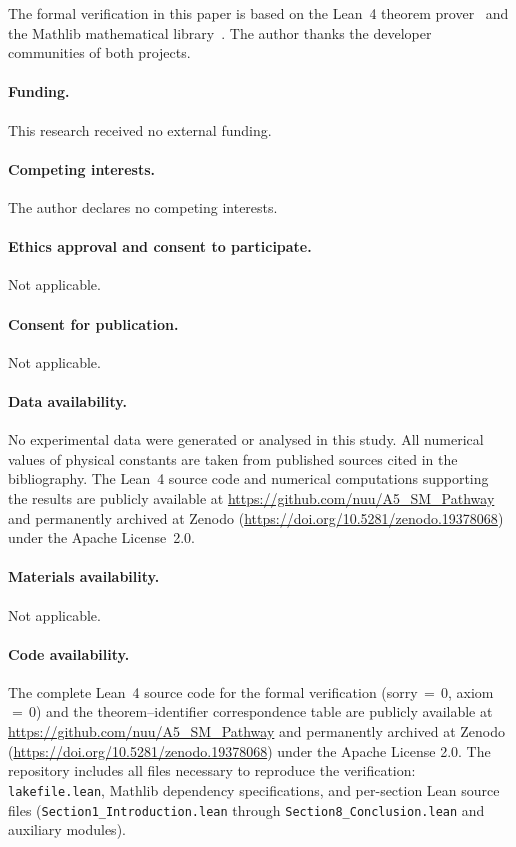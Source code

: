 \documentclass[sn-mathphys-num,Numbered]{sn-jnl}
\theoremstyle{thmstyleone}
\theoremstyle{thmstylethree}
\begin{document}

The formal verification in this paper is based on the Lean~4
theorem prover~\cite{Lean4} and the Mathlib mathematical
library~\cite{Mathlib}.
The author thanks the developer communities of both projects.


\paragraph{Funding.}
This research received no external funding.

\paragraph{Competing interests.}
The author declares no competing interests.

\paragraph{Ethics approval and consent to participate.}
Not applicable.

\paragraph{Consent for publication.}
Not applicable.

\paragraph{Data availability.}
No experimental data were generated or analysed in this study.
All numerical values of physical constants are taken from published
sources cited in the bibliography.
The Lean~4 source code and numerical computations supporting the
results are publicly available at
\url{https://github.com/nuu/A5_SM_Pathway}
and permanently archived at Zenodo
(\url{https://doi.org/10.5281/zenodo.19378068})
under the Apache License~2.0.

\paragraph{Materials availability.}
Not applicable.

\paragraph{Code availability.}
The complete Lean~4 source code for the formal verification
(sorry\,$=$\,0, axiom\,$=$\,0) and the theorem--identifier
correspondence table are publicly available at
\url{https://github.com/nuu/A5_SM_Pathway}
and permanently archived at Zenodo
(\url{https://doi.org/10.5281/zenodo.19378068})
under the Apache License 2.0.
The repository includes all files necessary to reproduce
the verification: \texttt{lakefile.lean}, Mathlib dependency
specifications, and per-section Lean source files
(\texttt{Section1\_Introduction.lean} through
\texttt{Section8\_Conclusion.lean} and auxiliary modules).
\end{document}
